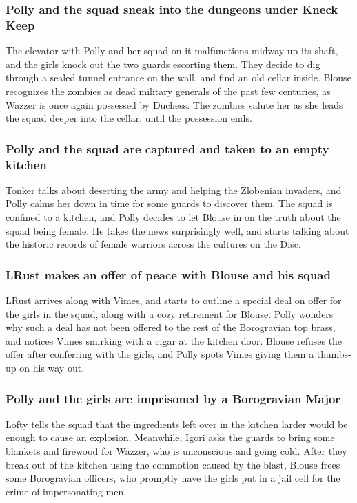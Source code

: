 \subsubsection{\Gls{Polly} and the squad sneak into the dungeons under Kneck Keep}
The elevator with \Gls{Polly} and her squad on it malfunctions midway up its shaft, and the girls
knock out the two guards escorting them. They decide to dig through a sealed tunnel entrance on the
wall, and find an old cellar inside. \Gls{Blouse} recognizes the zombies as dead military generals
of the past few centuries, as \Gls{Wazzer} is once again possessed by \Gls{Duchess}. The zombies
salute her as she leads the squad deeper into the cellar, until the possession ends.

\subsubsection{\Gls{Polly} and the squad are captured and taken to an empty kitchen}
\Gls{Tonker} talks about deserting the army and helping the Zlobenian invaders, and \Gls{Polly}
calms her down in time for some guards to discover them. The squad is confined to a kitchen, and
\Gls{Polly} decides to let \Gls{Blouse} in on the truth about the squad being female. He takes the
news surprisingly well, and starts talking about the historic records of female warriors across
the cultures on the Disc.

\subsubsection{\Gls{LRust} makes an offer of peace with \Gls{Blouse} and his squad}
\Gls{LRust} arrives along with \Gls{Vimes}, and starts to outline a special deal on offer for the
girls in the squad, along with a cozy retirement for \Gls{Blouse}. \Gls{Polly} wonders why such a
deal has not been offered to the rest of the Borogravian top brass, and notices \Gls{Vimes} smirking
with a cigar at the kitchen door. \Gls{Blouse} refuses the offer after conferring with the girls,
and \Gls{Polly} spots \Gls{Vimes} giving them a thumbs-up on his way out.

\subsubsection{\Gls{Polly} and the girls are imprisoned by a Borogravian Major}
\Gls{Lofty} tells the squad that the ingredients left over in the kitchen larder would be enough
to cause an explosion. Meanwhile, \Gls{Igori} asks the guards to bring some blankets and firewood
for \Gls{Wazzer}, who is unconscious and going cold. After they break out of the kitchen using the
commotion caused by the blast, \Gls{Blouse} frees some Borogravian officers, who promptly have the
girls put in a jail cell for the crime of impersonating men.

